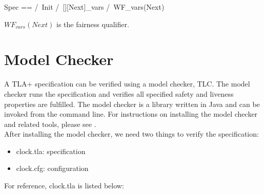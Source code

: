 \begin{tla}
    Spec ==
        /\ Init
        /\ [][Next]_vars
        /\ WF_vars(Next)
\end{tla}
\begin{tlatex}
%
%
%
%
\end{tlatex}
\newline

$WF_{vars}(Next)$ is the fairness qualifier.


\section{Model Checker}

A TLA+ specification can be verified using a model checker, TLC. The model
checker runs the specification and verifies all specified safety and liveness
properties are fulfilled. The model checker is a library written in Java and can
be invoked from the command line. For instructions on installing the model
checker and related tools, please see \cite{toolbox}.\\

After installing the model checker, we need two things to verify the specification:
\begin{itemize}
    \item clock.tla: specification
    \item clock.cfg: configuration
\end{itemize}

For reference, clock.tla is listed below:\\

